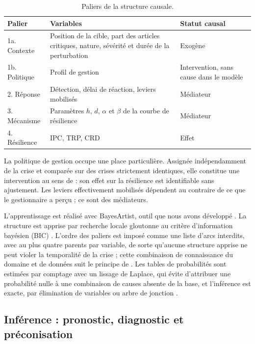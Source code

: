 \begin{table}[htbp]
\caption{Paliers de la structure causale.}
\label{tab:d10}
\footnotesize
\begin{tabularx}{\textwidth}{@{}P{2.3cm}LL@{}}
\toprule
\textbf{Palier} & \textbf{Variables} & \textbf{Statut causal} \\
\midrule
1a. Contexte & Position de la cible, part des articles critiques, nature, sévérité et durée de la perturbation & Exogène \\
1b. Politique & Profil de gestion & Intervention, sans cause dans le modèle \\
2. Réponse & Détection, délai de réaction, leviers mobilisés & Médiateur \\
3. Mécanisme & Paramètres $h$, $d$, $\alpha$ et $\beta$ de la courbe de résilience & Médiateur \\
4. Résilience & IPC, TRP, CRD & Effet \\
\bottomrule
\end{tabularx}
\end{table}

La politique de gestion occupe une place particulière. Assignée indépendamment de la crise et comparée sur des crises strictement identiques, elle constitue une intervention au sens de \citet{pearl2009} : son effet sur la résilience est identifiable sans ajustement. Les leviers effectivement mobilisés dépendent au contraire de ce que le gestionnaire a perçu ; ce sont des médiateurs.

L'apprentissage est réalisé avec BayesArtist, outil que nous avons développé \citep{bayesartist}. La structure est apprise par recherche locale gloutonne au critère d'information bayésien (BIC) \citep{schwarz1978}. L'ordre des paliers est imposé comme une liste d'arcs interdits, avec au plus quatre parents par variable, de sorte qu'aucune structure apprise ne peut violer la temporalité de la crise ; cette combinaison de connaissance du domaine et de données suit le principe de \citet{heckerman1995}. Les tables de probabilités sont estimées par comptage avec un lissage de Laplace, qui évite d'attribuer une probabilité nulle à une combinaison de causes absente de la base, et l'inférence est exacte, par élimination de variables ou arbre de jonction \citep{koller2009}.

\subsection{Inférence : pronostic, diagnostic et préconisation}
\label{sec:5.3}

